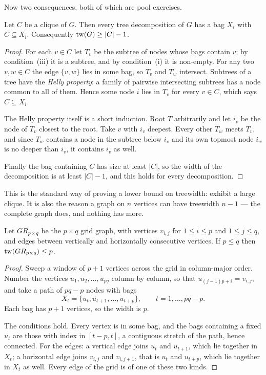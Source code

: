 Now two consequences, both of which are pool exercises.

\begin{proposition}\label{prop:tw-clique}
Let $C$ be a clique of $G$. Then every tree decomposition of $G$ has a bag $X_i$
with $C \subseteq X_i$. Consequently $\mathrm{tw}(G) \ge |C| - 1$.
\end{proposition}

\begin{proof}
For each $v \in C$ let $T_v$ be the subtree of nodes whose bags contain $v$; by
condition~(iii) it is a subtree, and by condition~(i) it is non-empty. For any
two $v,w \in C$ the edge $\{v,w\}$ lies in some bag, so $T_v$ and $T_w$
intersect. Subtrees of a tree have the \emph{Helly property}: a family of
pairwise intersecting subtrees has a node common to all of them. Hence some node
$i$ lies in $T_v$ for every $v \in C$, which says $C \subseteq X_i$.

The Helly property itself is a short induction. Root $T$ arbitrarily and let
$i_v$ be the node of $T_v$ closest to the root. Take $v$ with $i_v$ deepest.
Every other $T_w$ meets $T_v$, and since $T_w$ contains a node in the subtree
below $i_v$ and its own topmost node $i_w$ is no deeper than $i_v$, it contains
$i_v$ as well.

Finally the bag containing $C$ has size at least $|C|$, so the width of the
decomposition is at least $|C|-1$, and this holds for every decomposition.
\end{proof}

This is the standard way of proving a lower bound on treewidth: exhibit a large
clique. It is also the reason a graph on $n$ vertices can have treewidth
$n-1$ --- the complete graph does, and nothing has more.

\begin{proposition}[Grids]\label{prop:tw-grid}
Let $GR_{p \times q}$ be the $p \times q$ grid graph, with vertices $v_{i,j}$
for $1 \le i \le p$ and $1 \le j \le q$, and edges between vertically and
horizontally consecutive vertices. If $p \le q$ then
$\mathrm{tw}(GR_{p \times q}) \le p$.
\end{proposition}

\begin{proof}
Sweep a window of $p+1$ vertices across the grid in column-major order. Number
the vertices $u_1, u_2, \ldots, u_{pq}$ column by column, so that
$u_{(j-1)p + i} = v_{i,j}$, and take a path of $pq - p$ nodes with bags
\[ X_t = \{u_t, u_{t+1}, \ldots, u_{t+p}\}, \qquad t = 1, \ldots, pq-p. \]
Each bag has $p+1$ vertices, so the width is $p$.

The conditions hold. Every vertex is in some bag, and the bags containing a
fixed $u_t$ are those with index in $[t-p, t]$, a contiguous stretch of the
path, hence connected. For the edges: a vertical edge joins $u_t$ and $u_{t+1}$,
which lie together in $X_t$; a horizontal edge joins $v_{i,j}$ and $v_{i,j+1}$,
that is $u_t$ and $u_{t+p}$, which lie together in $X_t$ as well. Every edge of
the grid is of one of these two kinds.
\end{proof}

